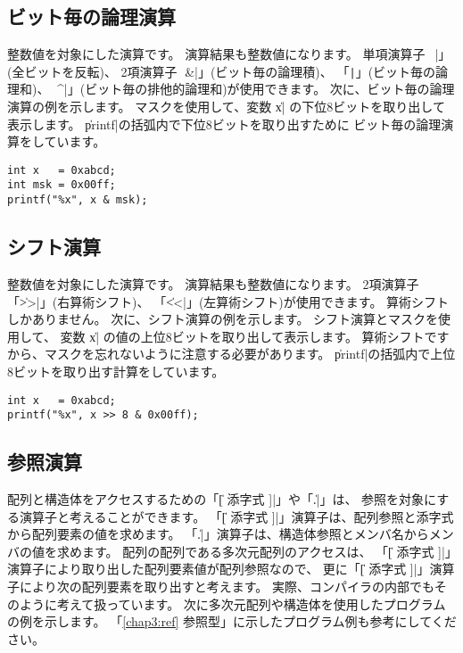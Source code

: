 \subsection{ビット毎の論理演算}

整数値を対象にした演算です。
演算結果も整数値になります。
単項演算子「\|~|」(全ビットを反転)、
2項演算子
「\|&|」(ビット毎の論理積)、
「\verb/|/」(ビット毎の論理和)、
「\|^|」(ビット毎の排他的論理和)が使用できます。
次に、ビット毎の論理演算の例を示します。
マスクを使用して、変数 \|x| の下位8ビットを取り出して表示します。
\|printf|の括弧内で下位8ビットを取り出すために
ビット毎の論理演算をしています。

\begin{mylist}
\begin{verbatim}
int x   = 0xabcd;
int msk = 0x00ff;
printf("%x", x & msk);
\end{verbatim}
\end{mylist}

\subsection{シフト演算}

整数値を対象にした演算です。
演算結果も整数値になります。
2項演算子
「\|>>|」(右算術シフト)、
「\|<<|」(左算術シフト)が使用できます。
算術シフトしかありません。
次に、シフト演算の例を示します。
シフト演算とマスクを使用して、
変数 \|x| の値の上位8ビットを取り出して表示します。
算術シフトですから、マスクを忘れないように注意する必要があります。
\|printf|の括弧内で上位8ビットを取り出す計算をしています。

\begin{mylist}
\begin{verbatim}
int x   = 0xabcd;
printf("%x", x >> 8 & 0x00ff);
\end{verbatim}
\end{mylist}

\subsection{参照演算}

配列と構造体をアクセスするための「\|[ 添字式 ]|」や「\|.|」は、
参照を対象にする演算子と考えることができます。
「\|[ 添字式 ]|」演算子は、配列参照と添字式から配列要素の値を求めます。
「\|.|」演算子は、構造体参照とメンバ名からメンバの値を求めます。
配列の配列である多次元配列のアクセスは、
「\|[ 添字式 ]|」演算子により取り出した配列要素値が配列参照なので、
更に「\|[ 添字式 ]|」演算子により次の配列要素を取り出すと考えます。
実際、\cmm コンパイラの内部でもそのように考えて扱っています。
次に多次元配列や構造体を使用したプログラムの例を示します。
「\ref{chap3:ref} 参照型」に示したプログラム例も参考にしてください。

